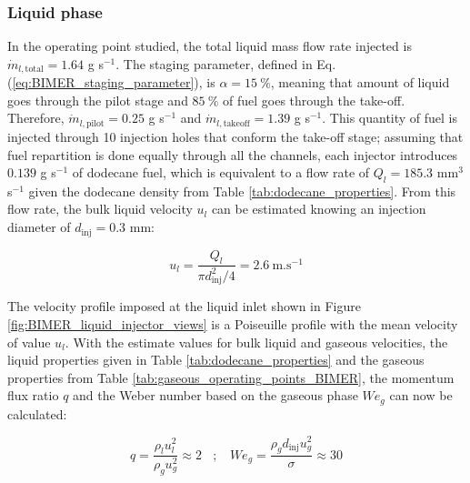 \subsubsection*{Liquid phase}

In the operating point studied, the total liquid mass flow rate injected is $\dot{m}_{l,\mathrm{total}} = 1.64$ g s$^{-1}$. The staging parameter, defined in Eq. (\ref{eq:BIMER_staging_parameter}), is $\alpha = 15 ~\%$, meaning that amount of liquid goes through the pilot stage and $85 ~\%$ of fuel goes through the take-off. Therefore, $\dot{m}_{l,\mathrm{pilot}} = 0.25$ g s$^{-1}$ and $\dot{m}_{l,\mathrm{takeoff}} = 1.39$ g s$^{-1}$. This quantity of fuel is injected through 10 injection holes that conform the take-off stage; assuming that fuel repartition is done equally through all the channels, each injector introduces $0.139$ g s$^{-1}$ of dodecane fuel, which is equivalent to a flow rate of $Q_l = 185.3$  mm$^3$ s$^{-1}$ given the dodecane density from Table \ref{tab:dodecane_properties}. From this flow rate, the bulk liquid velocity $u_l$ can be estimated knowing an injection diameter of $d_\mathrm{inj} = 0.3$ mm:

\begin{equation}
u_l = \frac{Q_l}{\pi d_\mathrm{inj}^2 / 4} = 2.6 ~ \mathrm{m}.\mathrm{s}^{-1}
\end{equation}


The velocity profile imposed at the liquid inlet shown in Figure \ref{fig:BIMER_liquid_injector_views} is a Poiseuille profile with the mean velocity of value $u_l$. With the estimate values for bulk liquid and gaseous velocities, the liquid properties given in Table \ref{tab:dodecane_properties} and the gaseous properties from Table \ref{tab:gaseous_operating_points_BIMER}, the momentum flux ratio $q$ and the Weber number based on the gaseous phase $We_g$ can now be calculated:


\begin{equation}
q =  \frac{\rho_l u_l^2}{\rho_g u_g^2} \approx 2 ~~~~ ; ~~~~  We_g =  \frac{\rho_g d_\mathrm{inj} u_g^2}{\sigma} \approx 30
\end{equation}

